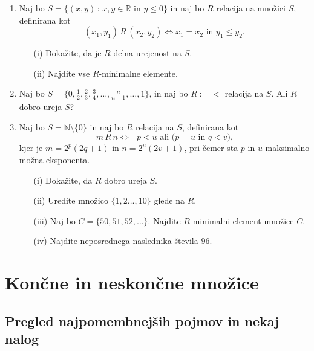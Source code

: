 \documentclass[11pt,paper=b5,footinclude,headinclude]{scrbook} %
\begin{document}
\begin{enumerate}
	\item Naj bo $S=\{ (x,y) \,:\, x, y\in\mathbb{R} \textrm{ in } y\leq 0 \}$ in naj bo $R$ relacija na množici $S$, definirana kot 
	$$(x_1,y_1)\, R\, (x_2,y_2) \Leftrightarrow  x_1 = x_2 \textrm{ in } y_1\leq y_2.$$
	\begin{enumerate}
		\item[(i)] Dokažite, da je $R$ delna urejenost na $S$.
		\item[(ii)] Najdite vse $R$-minimalne elemente.
	\end{enumerate}
	
	\item Naj bo $S= \{0,\frac{1}{2}, \frac{2}{3}, \frac{3}{4}, \ldots, \frac{n}{n+1}, \ldots, 1\}$, in naj bo $R:=<$ relacija na $S$. Ali $R$ dobro ureja $S$?
	
	\item Naj bo $S = \mathbb{N}\setminus \{0\}$ in naj bo  $R$ relacija na $S$, definirana kot 
	$$m\, R\, n \Leftrightarrow  \textrm{ $p< u$ ali ($p=u$ in $q < v$),} $$
	kjer je $m=2^p(2q+1)$ in $n=2^u(2v+1)$, pri čemer sta $p$ in $u$ maksimalno možna eksponenta.
	\begin{enumerate}
		\item[(i)] Dokažite, da $R$ dobro ureja $S$.
		\item[(ii)] Uredite množico $\{1,2\ldots, 10\}$ glede na $R$.
		\item[(iii)] Naj bo $C= \{50, 51, 52, \ldots\}$. Najdite $R$-minimalni element množice $C$.
		\item[(iv)] Najdite neposrednega naslednika števila $96$.
	\end{enumerate}
\end{enumerate}



\chapter{Končne in neskončne množice}

\section{Pregled najpomembnejših pojmov in nekaj nalog}
\end{document}
